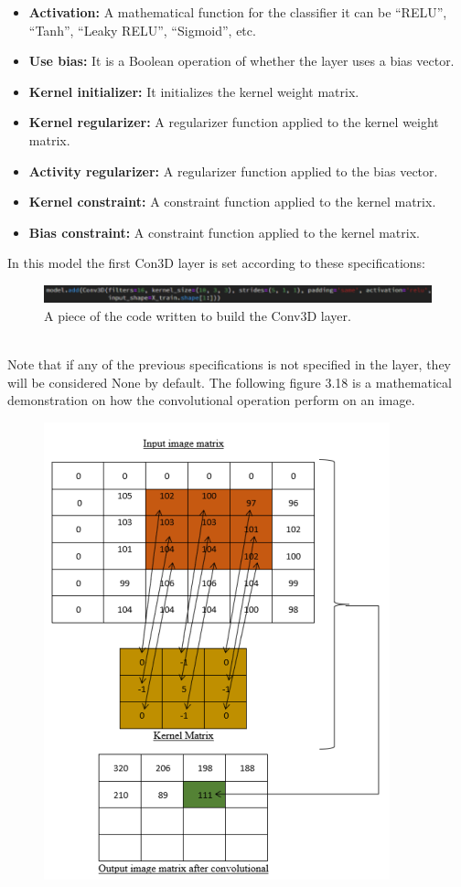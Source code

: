 \begin{itemize}
\begin{itemize}
        \item \textbf{Activation:} A mathematical function for the classifier it can be “RELU”, “Tanh”, “Leaky RELU”, “Sigmoid”, etc.
        \item \textbf{Use bias:} It is a Boolean operation of whether the layer uses a bias vector.
        \item \textbf{Kernel initializer:} It initializes the kernel weight matrix.
        \item \textbf{Kernel regularizer:} A regularizer function applied to the kernel weight matrix.
        \item \textbf{Activity regularizer:} A regularizer function applied to the bias vector.
        \item \textbf{Kernel constraint:} A constraint function applied to the kernel matrix.
        \item \textbf{Bias constraint:} A constraint function applied to the kernel matrix.
    \end{itemize}
    \newpage
    In this model the first Con3D layer is set according to these specifications:
    \begin{figure}[ht]
    \centering
    \includegraphics{Figures/c31}
    \decoRule
    \caption[A piece of the code written to build the Conv3D layer.]{A piece of the code written to build the Conv3D layer.}
    \label{fig:la}
    \end{figure}\hfill \\
    Note that if any of the previous specifications is not specified in the layer, they will be considered None by default.
    The following figure 3.18 is a mathematical demonstration on how the convolutional operation perform on an image. 
    \begin{figure}[ht]
    \centering
    \includegraphics{Figures/matrix1}

\end{figure}
\end{itemize}
